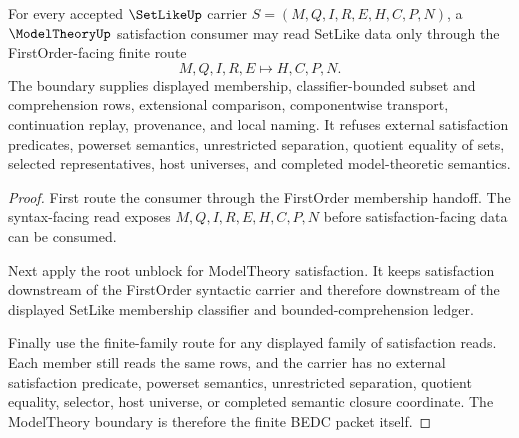 \begin{theorem}
\label{thm:setlike-modeltheory-satisfaction-boundary}
For every accepted $\SetLikeUp$ carrier $S=(M,Q,I,R,E,H,C,P,N)$, a $\ModelTheoryUp$ satisfaction consumer may read SetLike data only through the FirstOrder-facing finite route
$$
M,Q,I,R,E \longmapsto H,C,P,N .
$$
The boundary supplies displayed membership, classifier-bounded subset and comprehension rows, extensional comparison, componentwise transport, continuation replay, provenance, and local naming. It refuses external satisfaction predicates, powerset semantics, unrestricted separation, quotient equality of sets, selected representatives, host universes, and completed model-theoretic semantics.
\end{theorem}
\begin{proof}
First route the consumer through the FirstOrder membership handoff. The syntax-facing read exposes $M,Q,I,R,E,H,C,P,N$ before satisfaction-facing data can be consumed.

Next apply the root unblock for ModelTheory satisfaction. It keeps satisfaction downstream of the FirstOrder syntactic carrier and therefore downstream of the displayed SetLike membership classifier and bounded-comprehension ledger.

Finally use the finite-family route for any displayed family of satisfaction reads. Each member still reads the same rows, and the carrier has no external satisfaction predicate, powerset semantics, unrestricted separation, quotient equality, selector, host universe, or completed semantic closure coordinate. The ModelTheory boundary is therefore the finite BEDC packet itself.
\end{proof}

